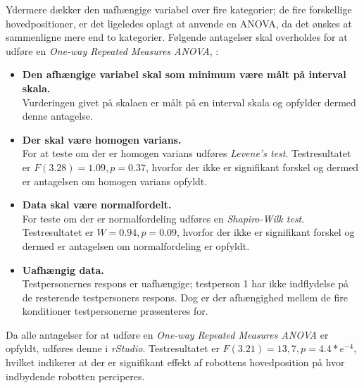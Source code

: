 Ydermere dækker den uafhængige variabel over fire kategorier; de fire forskellige hovedpositioner, er det ligeledes oplagt at anvende en ANOVA, da det ønskes at sammenligne mere end to kategorier.\blankline
%
Følgende antagelser skal overholdes for at udføre en \textit{One-way Repeated Measures ANOVA}, \parencite[ss. 507-509]{PDF:ExploringAssumptions}: \blankline  
%
\begin{itemize}
	\item \textbf{Den afhængige variabel skal som minimum være målt på interval skala.}\\
	Vurderingen givet på skalaen er målt på en interval skala og opfylder dermed denne antagelse.
	\item \textbf{Der skal være homogen varians. }\\
	For at teste om der er homogen varians udføres \textit{Levene's test}. Testresultatet er $F(3.28)=1.09, p=0.37$, hvorfor der ikke er signifikant forskel og dermed er antagelsen om homogen varians opfyldt. 
	\item \textbf{Data skal være normalfordelt.}\\
	For teste om der er normalfordeling udføres en \textit{Shapiro-Wilk test}. Testresultatet er $W=0.94, p=0.09$, hvorfor der ikke er signifikant forskel og dermed er antagelsen om normalfordeling er opfyldt.
	\item \textbf{Uafhængig data.}\\
	Testpersonernes respons er uafhængige; testperson 1 har ikke indflydelse på de resterende testpersoners respons. Dog er der afhængighed mellem de fire konditioner testpersonerne præsenteres for.\blankline
\end{itemize}
\noindent
%
Da alle antagelser for at udføre en \textit{One-way Repeated Measures ANOVA} er opfyldt, udføres denne i \textit{rStudio}. Testresultatet er $F(3.21)=13,7, p=4.4*e^{-4}$, hvilket indikerer at der er signifikant effekt af robottens hovedposition på hvor indbydende robotten perciperes.

